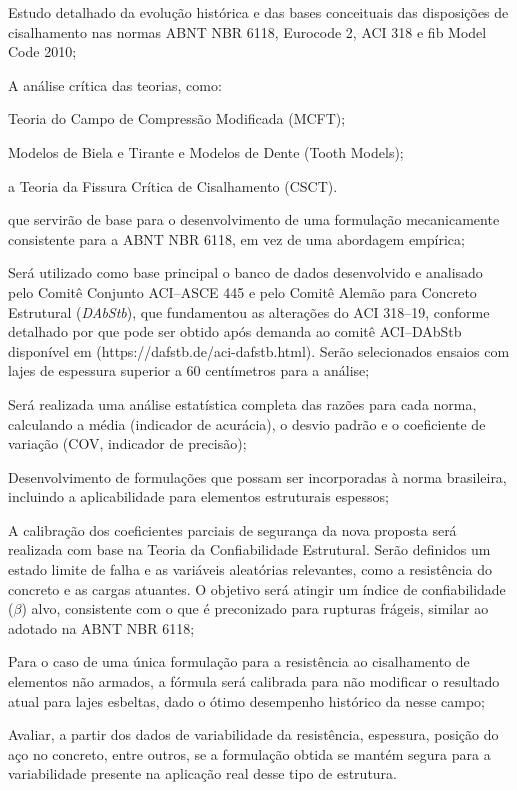 \begin{alineas}
    \item Estudo detalhado da evolução histórica e das bases conceituais das disposições de cisalhamento nas normas ABNT NBR 6118, Eurocode 2, ACI 318 e fib Model Code 2010;
    \item A análise crítica das teorias, como:
	\begin{alineas}
		\item Teoria do Campo de Compressão Modificada (MCFT);
		\item Modelos de Biela e Tirante e Modelos de Dente (Tooth Models);
		\item a Teoria da Fissura Crítica de Cisalhamento (CSCT).
	\end{alineas}\noindent que servirão de base para o desenvolvimento de uma formulação mecanicamente consistente para a ABNT NBR 6118, em vez de uma abordagem empírica;
    \item Será utilizado como base principal o banco de dados desenvolvido e analisado pelo Comitê Conjunto ACI--ASCE 445 e pelo Comitê Alemão para Concreto Estrutural (\textit{DAbStb}), que fundamentou as alterações do ACI 318--19, conforme detalhado por \textcite{Kuchma2019} que pode ser obtido após demanda ao comitê ACI--DAbStb disponível em (https://dafstb.de/aci-dafstb.html). Serão selecionados ensaios com lajes de espessura superior a 60 centímetros para a análise;
    \item Será realizada uma análise estatística completa das razões para cada norma, calculando a média (indicador de acurácia), o desvio padrão e o coeficiente de variação (COV, indicador de precisão);
    \item Desenvolvimento de formulações que possam ser incorporadas à norma brasileira, incluindo a aplicabilidade para elementos estruturais espessos;
    \item A calibração dos coeficientes parciais de segurança da nova proposta será realizada com base na Teoria da Confiabilidade Estrutural. Serão definidos um estado limite de falha e as variáveis aleatórias relevantes, como a resistência do concreto e as cargas atuantes. O objetivo será atingir um índice de confiabilidade ($\beta$) alvo, consistente com o que é preconizado para rupturas frágeis, similar ao adotado na ABNT NBR 6118;
    \item Para o caso de uma única formulação para a resistência ao cisalhamento de elementos não armados, a fórmula será calibrada para não modificar o resultado atual para lajes esbeltas, dado o ótimo desempenho histórico da \textcite{NBR6118:2023} nesse campo;
    \item Avaliar, a partir dos dados de variabilidade da resistência, espessura, posição do aço no concreto, entre outros, se a formulação obtida se mantém segura para a variabilidade presente na aplicação real desse tipo de estrutura.
\end{alineas}
